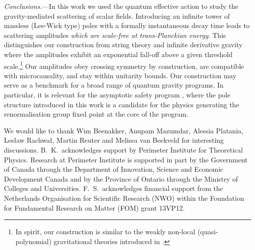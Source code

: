 \documentclass[aps,prl,onecolumn,superscriptaddress,longbibliography,nofootinbib,floatfix,showpacs,12pt]{revtex4-1}
\begin{document}
\textit{Conclusions.}---In this work we used the quantum effective action to study the gravity-mediated scattering of scalar fields. 
Introducing an infinite tower of massless (Lee-Wick type) poles with a formally instantaneous decay time leads to scattering amplitudes \emph{which are scale-free at trans-Planckian energy}.
This distinguishes our construction from string theory \cite{Green:1987sp} and infinite derivative gravity \cite{Biswas:2011ar,Talaganis:2016ovm, Talaganis:2014ida, Buoninfante:2018xiw,Buoninfante:2018mre, Modesto:2017sdr} where the amplitudes exhibit an exponential fall-off above a given threshold scale.\footnote{In spirit, our construction is similar to the weakly non-local (quasi-polynomial) gravitational theories introduced in \cite{Modesto:2014lga,Modesto:2015lna,Dona:2015tra}.}
Our amplitudes obey crossing symmetry by construction, are compatible with microcausality, and stay within unitarity bounds.
Our construction may serve as a benchmark for a broad range of quantum gravity programs.
In particular, it is relevant for the asymptotic safety program \cite{Percacci:2017fkn, Reuter:2019byg, Donoghue:2019clr, Bonanno:2020bil}, where the pole structure introduced in this work is a candidate for the physics generating the renormalisation group fixed point at the core of the program.




\bigskip

\acknowledgments

We would like to thank Wim Beenakker, Anupam Mazumdar, Alessia Platania, Les\l{}aw Rachwa\l{}, Martin Reuter and Melissa van Beekveld for interesting discussions. B.\ K.\ acknowledges support by Perimeter Institute for Theoretical Physics. Research at Perimeter Institute is supported in part by the Government of Canada through the Department of Innovation, Science and Economic Development Canada and by the Province of Ontario through the Ministry of Colleges and Universities. F.\ S.\  acknowledges financial support from  the Netherlands Organisation for Scientific Research (NWO) within the Foundation for Fundamental Research on Matter (FOM) grant 13VP12.




\end{document}

